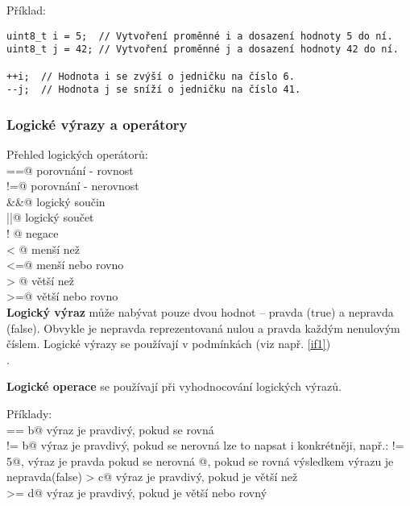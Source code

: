 Příklad:
\begin{verbatim}
uint8_t i = 5;  // Vytvoření proměnné i a dosazení hodnoty 5 do ní.  
uint8_t j = 42; // Vytvoření proměnné j a dosazení hodnoty 42 do ní. 

++i;  // Hodnota i se zvýší o jedničku na číslo 6.
--j;  // Hodnota j se sníží o jedničku na číslo 41.
\end{verbatim}



\subsubsection{Logické výrazy a operátory} \label{logika1}

Přehled logických operátorů: \\
\verb@==@ porovnání - rovnost \\ 
\verb@!=@ porovnání - nerovnost \\
\verb@&&@ logický součin \\ 
\verb@||@ logický součet \\
\verb@! @ negace \\ 
\verb@< @ menší než \\
\verb@<=@ menší nebo rovno \\
\verb@> @ větší než \\
\verb@>=@ větší nebo rovno \\


\textbf{Logický výraz} může nabývat pouze dvou hodnot -- pravda (true) a nepravda (false).  
Obvykle je nepravda reprezentovaná nulou a pravda každým nenulovým číslem. Logické výrazy se používají v podmínkách (viz např. \ref{if1})\\.

  \textbf{Logické operace} se používají při vyhodnocování logických výrazů.    

Příklady: \\
\verb@a == b@ výraz je pravdivý, pokud se \verb@a@ rovná \verb@b@ \\
\verb@a != b@ výraz je pravdivý, pokud se \verb@a@ nerovná \verb@b@ 
lze to napsat i konkrétněji, např.: \verb@a != 5@, výraz je pravda pokud se \verb@a@ nerovná @, pokud se rovná výsledkem výrazu je nepravda(false)
\verb@b > c@ výraz je pravdivý, pokud je \verb@b@ větší než \verb@c@ \\
\verb@b >= d@ výraz je pravdivý, pokud je \verb@b@ větší nebo rovný \verb@d@ \\


